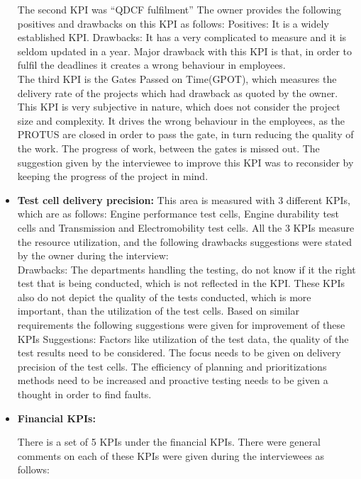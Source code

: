\begin{itemize}
The second KPI was “QDCF fulfilment”
The owner provides the following positives and drawbacks on this KPI as follows:
Positives: It is a widely established KPI.
Drawbacks: It has a very complicated to measure and it is seldom updated in a year. Major drawback with this KPI is that, in order to fulfil the deadlines it creates a wrong behaviour in employees.\\

The third KPI is the Gates Passed on Time(GPOT), which measures the delivery rate of the projects which had drawback as quoted by the owner. This KPI is very subjective in nature, which does not consider the project size and complexity. It drives the wrong behaviour in the employees, as the PROTUS are closed in order to pass the gate, in turn reducing the quality of the work. The progress of work, between the gates is missed out.
The suggestion given by the interviewee to improve this KPI was to reconsider by keeping the progress of the project in mind.\\


\item \textbf{Test cell delivery precision:} This area is measured with 3 different KPIs, which are as follows: Engine performance test cells, Engine durability test cells and Transmission and Electromobility test cells. All the 3 KPIs measure the resource utilization, and the following drawbacks suggestions were stated by the owner during the interview:\\

Drawbacks: The departments handling the testing, do not know if it the right test that is being conducted, which is not reflected in the KPI. These KPIs also do not depict the quality of the tests conducted, which is more important, than the utilization of the test cells. 
Based on similar requirements the following suggestions were given for improvement of these KPIs
Suggestions: Factors like utilization of the test data, the quality of the test results need to be considered. The focus needs to be given on delivery precision of  the test cells. 
The efficiency of planning and prioritizations methods need to be increased and proactive testing needs to be given a thought in order to find faults.
\\

\item \textbf{Financial KPIs:} 

There is a set of 5 KPIs under the financial KPIs. There were general comments on each of these KPIs were given during the interviewees as follows:\\


\end{itemize}
